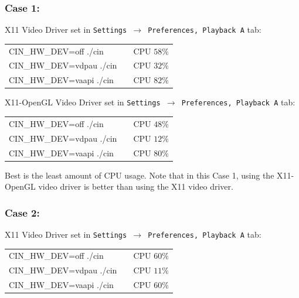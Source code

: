 \subsubsection*{Case 1:}%
\label{ssub:case_1}

\noindent X11 Video Driver set in \texttt{Settings $\rightarrow$ Preferences, Playback A} tab:

\begin{center}
	\begin{tabular}{lcr}
		CIN\_HW\_DEV=off ./cin & &CPU $58\%$ \\
		CIN\_HW\_DEV=vdpau ./cin & &CPU $32\%$ \\
		CIN\_HW\_DEV=vaapi ./cin & &CPU $82\%$ \\
	\end{tabular}
\end{center}

\noindent X11-OpenGL Video Driver set in \texttt{Settings $\rightarrow$ Preferences, Playback A} tab:

\begin{center}
	\begin{tabular}{lcr}
		CIN\_HW\_DEV=off ./cin & &CPU $48\%$ \\
		CIN\_HW\_DEV=vdpau ./cin & &CPU $12\%$ \\
		CIN\_HW\_DEV=vaapi ./cin & &CPU $80\%$ \\
	\end{tabular}
\end{center}

\noindent Best is the least amount of CPU usage. Note that in this Case 1, using the X11-OpenGL video driver is  
better than using the X11 video driver.

\subsubsection*{Case 2:}%
\label{ssub:case_2}

\noindent X11 Video Driver set in \texttt{Settings $\rightarrow$ Preferences, Playback A} tab:

\begin{center}
	\begin{tabular}{lcr}
		CIN\_HW\_DEV=off ./cin & &CPU $60\%$ \\
		CIN\_HW\_DEV=vdpau ./cin & &CPU $11\%$ \\
		CIN\_HW\_DEV=vaapi ./cin & &CPU $60\%$ \\
	\end{tabular}
\end{center}

